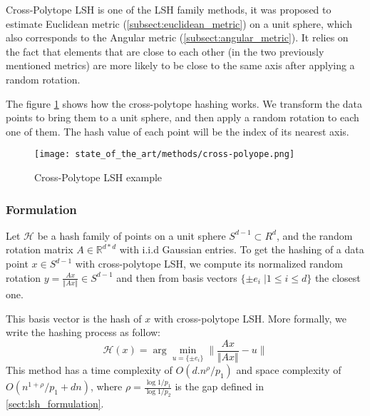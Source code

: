Cross-Polytope LSH is one of the LSH family methods, it was proposed to estimate
Euclidean metric (\ref{subsect:euclidean_metric}) on a unit sphere, which also
corresponds to the Angular metric (\ref{subsect:angular_metric}). It relies on
the fact that elements that are close to each other (in the two previously
mentioned metrics) are more likely to be close to the same axis after applying a
random rotation. \citep{andoni_practicalsh_2015}

The figure \ref{fig:crosspolytope_example} shows how the cross-polytope hashing
works. We transform the data points to bring them to a unit sphere, and then
apply a random rotation to each one of them. The hash value of each point will
be the index of its nearest axis.

\begin{figure}[ht]
    \centering
    \texttt{[image: state\_of\_the\_art/methods/cross-polyope.png]}
    \caption{Cross-Polytope LSH example}
    \label{fig:crosspolytope_example}
\end{figure}

\subsubsection{Formulation}
Let $\mathcal{H}$ be a hash family of points on a unit sphere  $S^{d-1} \subset
R^d$, and the random rotation matrix $A \in \mathbb{R}^{d*d}$ with i.i.d
Gaussian entries. To get the hashing of a data point $x \in S^{d-1}$ with
cross-polytope LSH, we compute its normalized random rotation $y = \frac{A x
}{\Vert{A x} \Vert} \in  S^{d-1}$ and then from basis vectors $\lbrace \pm
e_i \; \vert 1 \leq i \leq d \rbrace$ the closest one.

This basis vector is the hash of $x$ with cross-polytope LSH. More formally, we
write the hashing process as follow:
$$
    \mathcal{H}(x) = \arg \min_{u = \lbrace \pm e_i \rbrace} \lVert \frac{A x }{\Vert{A x} \Vert} - u \rVert
$$
This method has a time complexity of $O(d.n^\rho / p_1)$ and space complexity of
$O(n^{1 + \rho} / p_1 + dn)$, where $\rho = \frac{\log{1/
            p_1}}{\log{1/ p_2}}$ is the gap defined in \ref{sect:lsh_formulation}.
\citep{indyk_2000}

